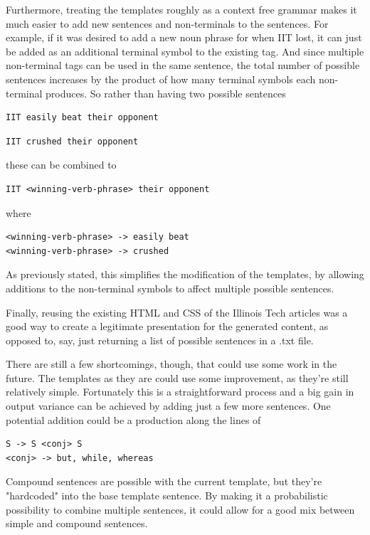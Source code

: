 \documentclass{article}
\begin{document}
Furthermore, treating the templates roughly as a context free grammar makes it much easier to add new sentences and non-terminals to the sentences. For example, if it was desired to add a new noun phrase for when IIT lost, it can just be added as an additional terminal symbol to the existing tag. And since multiple non-terminal tags can be used in the same sentence, the total number of possible sentences increases by the product of how many terminal symbols each non-terminal produces. So rather than having two possible sentences  

\begin{verbatim}
IIT easily beat their opponent
\end{verbatim}
\begin{verbatim}
IIT crushed their opponent
\end{verbatim}

these can be combined to 

\begin{verbatim}
IIT <winning-verb-phrase> their opponent
\end{verbatim}
where
\begin{verbatim}
<winning-verb-phrase> -> easily beat
<winning-verb-phrase> -> crushed
\end{verbatim}

As previously stated, this simplifies the modification of the templates, by allowing additions to the non-terminal symbols to affect multiple possible sentences.

Finally, reusing the existing HTML and CSS of the Illinois Tech articles was a good way to create a legitimate presentation for the generated content, as opposed to, say, just returning a list of possible sentences in a .txt file.

There are still a few shortcomings, though, that could use some work in the future. The templates as they are could use some improvement, as they're still relatively simple. Fortunately this is a straightforward process and a big gain in output variance can be achieved by adding just a few more sentences. One potential addition could be a production along the lines of
\begin{verbatim}
S -> S <conj> S
<conj> -> but, while, whereas
\end{verbatim}

Compound sentences are possible with the current template, but they're "hardcoded" into the base template sentence. By making it a probabilistic possibility to combine multiple sentences, it could allow for a good mix between simple and compound sentences.
\end{document}
